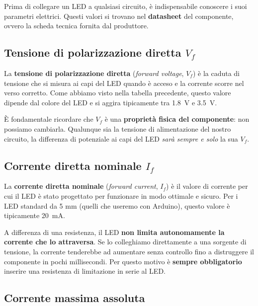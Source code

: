 Prima di collegare un LED a qualsiasi circuito, è indispensabile conoscere i suoi parametri elettrici. Questi valori si trovano nel \textbf{datasheet} del componente, ovvero la scheda tecnica fornita dal produttore.

\subsection*{Tensione di polarizzazione diretta \texorpdfstring{$V_f$}{Vf}}

La \textbf{tensione di polarizzazione diretta} (\textit{forward voltage}, $V_f$) è la caduta di tensione che si misura ai capi del LED quando è acceso e la corrente scorre nel verso corretto. Come abbiamo visto nella tabella precedente, questo valore dipende dal colore del LED e si aggira tipicamente tra \SI{1.8}{\volt} e \SI{3.5}{\volt}.

È fondamentale ricordare che $V_f$ è una \textbf{proprietà fisica del componente}: non possiamo cambiarla. Qualunque sia la tensione di alimentazione del nostro circuito, la differenza di potenziale ai capi del LED \textit{sarà sempre e solo} la sua $V_f$.

\subsection*{Corrente diretta nominale \texorpdfstring{$I_f$}{If}}

La \textbf{corrente diretta nominale} (\textit{forward current}, $I_f$) è il valore di corrente per cui il LED è stato progettato per funzionare in modo ottimale e sicuro. Per i LED standard da 5 mm (quelli che useremo con Arduino), questo valore è tipicamente \SI{20}{\milli\ampere}.

\begin{tcolorbox}[colback=red!4, colframe=red!60, title=\textbf{Perché la corrente è così critica?}]
    A differenza di una resistenza, il LED \textbf{non limita autonomamente la corrente 
    che lo attraversa}. Se lo colleghiamo direttamente a una sorgente di tensione, la 
    corrente tenderebbe ad aumentare senza controllo fino a distruggere il componente 
    in pochi millisecondi. Per questo motivo è \textbf{sempre obbligatorio} inserire 
    una resistenza di limitazione in serie al LED.
\end{tcolorbox}

\subsection*{Corrente massima assoluta}

